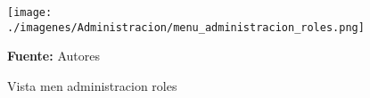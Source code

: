 \begin{figure}[!htb]
  \begin{center}
\texttt{[image: ./imagenes/Administracion/menu\_administracion\_roles.png]}
    \caption{Vista men administracion roles}
    \label{fig:Vista_menu_administracion_roles}
    \textbf{Fuente:}  Autores
  \end{center}
\end{figure}
